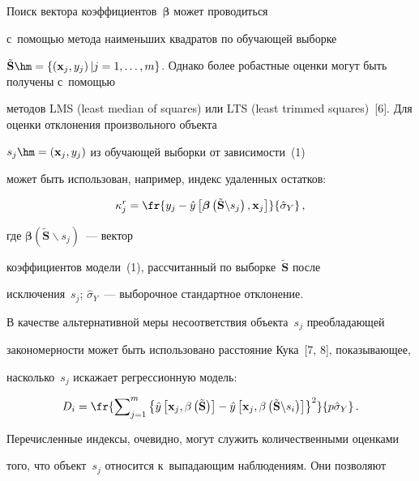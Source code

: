   

  Поиск вектора коэффициентов~$\boldsymbol{\beta}$ может проводиться 

с~помощью метода наименьших квадратов по обучающей выборке 

$\tilde{\mathbf{S}}\hm= \left\{ \left( \mathbf{x}_j, y_j\right)\vert j=1,\ldots, 

m\right\}$. Однако более робастные оценки могут быть получены с~помощью 

методов LMS (least median of squares) или LTS (least trimmed squares)~[6]. Для оценки отклонения произвольного объекта 

$s_j\hm=\left(\mathbf{x}_j, y_j\right)$ из обучающей выборки от зависимости~(1) 

может быть использован, например, индекс удаленных остатков:

  $$

  \kappa_j^r= \fr{y_j-\hat{y}\left[ \boldsymbol{\beta}\left( 

\tilde{\mathbf{S}}\backslash s_j\right), \mathbf{x}_j\right]}{\hat{\sigma}_Y}\,,

  $$

где $\boldsymbol{\beta}\left( \tilde{\mathbf{S}}\backslash s_j\right)$~--- вектор 

коэффициентов модели~(1), рассчитанный по выборке~$\tilde{\mathbf{S}}$ после 

исключения~$s_j$; $\hat{\sigma}_Y$~--- выборочное стандартное отклонение.



  В качестве альтернативной меры несоответствия объекта~$s_j$ преобладающей 

закономерности может быть использовано расстояние Кука~[7, 8], показывающее, 

насколько~$s_j$ искажает регрессионную модель:

  $$

  D_i=\fr{\sum\nolimits^m_{j=1} \left\{ \hat{y}\left[ \mathbf{x}_j, \beta\left( 

\tilde{\mathbf{S}}\right)\right] -\hat{y} \left[ \mathbf{x}_j, \beta \left( 

\tilde{\mathbf{S}}\backslash s_i\right) \right] \right\}^2} {p\hat{\sigma}_Y}\,.

  $$

Перечисленные индексы, очевидно, могут служить количественными оценками 

того, что объект~$s_j$ относится к~выпадающим наблюдениям. Они позволяют 

